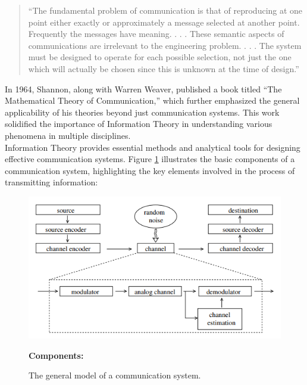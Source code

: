 \documentclass[12pt, oneside]{book}
\begin{document}
\begin{quote}
	“The fundamental problem of communication is that of reproducing at one point either exactly or approximately a message selected at another point. Frequently the messages have meaning. . . . These semantic aspects of communications are irrelevant to the engineering problem. . . . The system must be designed to operate for each possible selection, not just the one which will actually be chosen since this is unknown at the time of design.”
\end{quote}
In 1964, Shannon, along with Warren Weaver, published a book titled “The Mathematical Theory of Communication,” which further emphasized the general applicability of his theories beyond just communication systems. This work solidified the importance of Information Theory in understanding various phenomena in multiple disciplines.\\
Information Theory provides essential methods and analytical tools for designing effective communication systems. Figure \ref{fig:1.1} illustrates the basic components of a communication system, highlighting the key elements involved in the process of transmitting information:\\
\begin{figure}[h!]
	\centering
	\includegraphics[width=\linewidth]{./1.1.png}
	\caption{The general model of a communication system.}
	\label{fig:1.1}
	\textbf{Components:}
\end{figure}
\\
\end{document}
